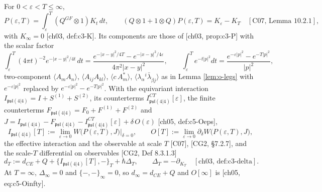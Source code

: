 \begin{definition}
\label{def:o-scale}
For $0<\varepsilon<T\le\infty$,
\begin{equation}
P(\varepsilon,T)=\int_\varepsilon^T(Q^{GF}\otimes1)K_t\,dt,\qquad (Q\otimes1+1\otimes Q)P(\varepsilon,T)=K_\varepsilon-K_T\quad[\text{C07, Lemma 10.2.1}],
\label{eq:o-PT}
\end{equation}
with $K_\infty=0$ [ch03, def:c3-K]. Its components are those of [ch03, prop:c3-P] with the scalar factor
\[
\int_\varepsilon^T(4\pi t)^{-2}e^{-|x-y|^2/4t}\,dt=\frac{e^{-|x-y|^2/4T}-e^{-|x-y|^2/4\varepsilon}}{4\pi^2|x-y|^2},\qquad \int_\varepsilon^Te^{-t|p|^2}dt=\frac{e^{-\varepsilon|p|^2}-e^{-T|p|^2}}{|p|^2},
\]
two-component $\langle A_mA_n\rangle$, $\langle A_{ij}A_{kl}\rangle$, $\langle c\,A^*_m\rangle$, $\langle\lambda_\alpha{}^i\bar\lambda_{\dot\beta j}\rangle$ as in Lemma \ref{lem:o-legs} with $e^{-\varepsilon|p|^2}$ replaced by $e^{-\varepsilon|p|^2}-e^{-T|p|^2}$. With the equivariant interaction $I_{\mathfrak{psl}(4|4)}=I+S^{(1)}+S^{(2)}$, its counterterms $I^{CT}_{\mathfrak{psl}(4|4)}[\varepsilon]$, the finite counterterms $F_{\mathfrak{psl}(4|4)}=F_0+F^{(1)}+F^{(2)}$ and $J=I_{\mathfrak{psl}(4|4)}-F_{\mathfrak{psl}(4|4)}-I^{CT}_{\mathfrak{psl}(4|4)}[\varepsilon]+\delta\,O(\varepsilon)$ [ch05, def:c5-Oeps],
\[
I_{\mathfrak{psl}(4|4)}[T]:=\lim_{\varepsilon\to0}W\big(P(\varepsilon,T),J\big)\big|_{\delta=0},\qquad O[T]:=\lim_{\varepsilon\to0}\partial_\delta W\big(P(\varepsilon,T),J\big),
\]
the effective interaction and the observable at scale $T$ [C07], [CG2, §7.2.7], and the scale-$T$ differential on observables [CG2, Def 8.3.1.3]
\begin{equation}
d_T:=d_{CE}+Q+\big\{I_{\mathfrak{psl}(4|4)}[T],-\big\}_T+\hbar\Delta_T,\qquad \Delta_T=-\partial_{K_T}\quad[\text{ch03, def:c3-delta}].
\label{eq:o-dT}
\end{equation}
At $T=\infty$, $\Delta_\infty=0$ and $\{-,-\}_\infty=0$, so $d_\infty=d_{CE}+Q$ and $O[\infty]$ is [ch05, eq:c5-Oinfty].
\end{definition}

